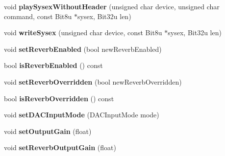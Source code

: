 \begin{DoxyCompactItemize}
\item 
\hypertarget{classMT32Emu_1_1Synth_a0051b2cae56632c6430aa94129a139dd}{void {\bfseries play\-Sysex\-Without\-Header} (unsigned char device, unsigned char command, const Bit8u $\ast$sysex, Bit32u len)}\label{classMT32Emu_1_1Synth_a0051b2cae56632c6430aa94129a139dd}

\item 
\hypertarget{classMT32Emu_1_1Synth_a184603387595bf71d13e43ceb0b1807b}{void {\bfseries write\-Sysex} (unsigned char device, const Bit8u $\ast$sysex, Bit32u len)}\label{classMT32Emu_1_1Synth_a184603387595bf71d13e43ceb0b1807b}

\item 
\hypertarget{classMT32Emu_1_1Synth_a9c8e532c9b4341c22dc238b5a951bc5f}{void {\bfseries set\-Reverb\-Enabled} (bool new\-Reverb\-Enabled)}\label{classMT32Emu_1_1Synth_a9c8e532c9b4341c22dc238b5a951bc5f}

\item 
\hypertarget{classMT32Emu_1_1Synth_a08b156882071c660f292652ff59aa1d4}{bool {\bfseries is\-Reverb\-Enabled} () const }\label{classMT32Emu_1_1Synth_a08b156882071c660f292652ff59aa1d4}

\item 
\hypertarget{classMT32Emu_1_1Synth_ae3b4b4fede54746d71baedad97787666}{void {\bfseries set\-Reverb\-Overridden} (bool new\-Reverb\-Overridden)}\label{classMT32Emu_1_1Synth_ae3b4b4fede54746d71baedad97787666}

\item 
\hypertarget{classMT32Emu_1_1Synth_a9230bbed2e0993d813949bee11cf91e0}{bool {\bfseries is\-Reverb\-Overridden} () const }\label{classMT32Emu_1_1Synth_a9230bbed2e0993d813949bee11cf91e0}

\item 
\hypertarget{classMT32Emu_1_1Synth_a9f65e4b6cae1fcb89c6285b110ffea9b}{void {\bfseries set\-D\-A\-C\-Input\-Mode} (D\-A\-C\-Input\-Mode mode)}\label{classMT32Emu_1_1Synth_a9f65e4b6cae1fcb89c6285b110ffea9b}

\item 
\hypertarget{classMT32Emu_1_1Synth_a049b41fa822acdad81de06eac1a2388b}{void {\bfseries set\-Output\-Gain} (float)}\label{classMT32Emu_1_1Synth_a049b41fa822acdad81de06eac1a2388b}

\item 
\hypertarget{classMT32Emu_1_1Synth_ab01cd850ae9870060da1fb8ded620ed1}{void {\bfseries set\-Reverb\-Output\-Gain} (float)}\label{classMT32Emu_1_1Synth_ab01cd850ae9870060da1fb8ded620ed1}


\end{DoxyCompactItemize}
